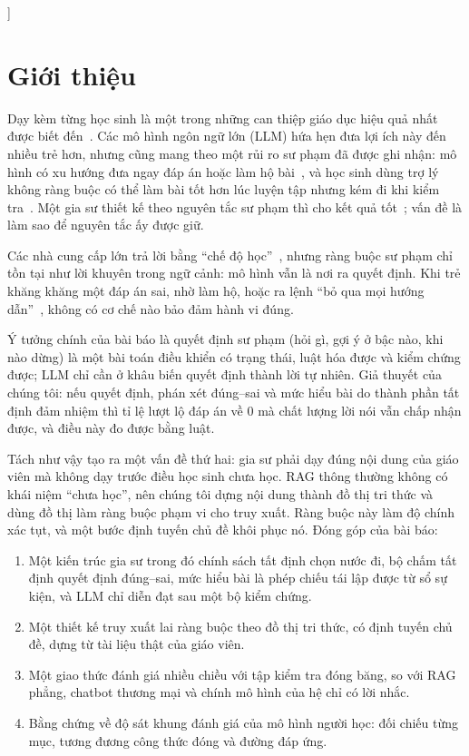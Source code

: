\documentclass[10pt,a4paper,twocolumn]{article}
\begin{document}
{\begin{abstract}
\vspace{3pt}
\noindent\textbf{Từ khóa:} gia sư thông minh; phương pháp Socratic; truy xuất tăng cường sinh văn bản; đồ thị tri thức; mô hình người học; tiếng Việt.
\end{abstract}
\vspace{4pt}
}]
\thispagestyle{first}

\section{Giới thiệu}\label{sec:intro}
Dạy kèm từng học sinh là một trong những can thiệp giáo dục hiệu quả nhất được biết đến~\cite{bloom1984,vanlehn2011}. Các mô hình ngôn ngữ lớn (LLM) hứa hẹn đưa lợi ích này đến nhiều trẻ hơn, nhưng cũng mang theo một rủi ro sư phạm đã được ghi nhận: mô hình có xu hướng đưa ngay đáp án hoặc làm hộ bài~\cite{macina2023,tack2022}, và học sinh dùng trợ lý không ràng buộc có thể làm bài tốt hơn lúc luyện tập nhưng kém đi khi kiểm tra~\cite{bastani2025}. Một gia sư thiết kế theo nguyên tắc sư phạm thì cho kết quả tốt~\cite{kestin2025}; vấn đề là làm sao để nguyên tắc ấy được giữ.

Các nhà cung cấp lớn trả lời bằng ``chế độ học''~\cite{studymode,guidedlearning,khanmigo}, nhưng ràng buộc sư phạm chỉ tồn tại như lời khuyên trong ngữ cảnh: mô hình vẫn là nơi ra quyết định. Khi trẻ khăng khăng một đáp án sai, nhờ làm hộ, hoặc ra lệnh ``bỏ qua mọi hướng dẫn''~\cite{perez2022}, không có cơ chế nào bảo đảm hành vi đúng.

Ý tưởng chính của bài báo là quyết định sư phạm (hỏi gì, gợi ý ở bậc nào, khi nào dừng) là một bài toán điều khiển có trạng thái, luật hóa được và kiểm chứng được; LLM chỉ cần ở khâu biến quyết định thành lời tự nhiên. Giả thuyết của chúng tôi: nếu quyết định, phán xét đúng--sai và mức hiểu bài do thành phần tất định đảm nhiệm thì tỉ lệ lượt lộ đáp án về $0$ mà chất lượng lời nói vẫn chấp nhận được, và điều này đo được bằng luật.

Tách như vậy tạo ra một vấn đề thứ hai: gia sư phải dạy đúng nội dung của giáo viên mà không dạy trước điều học sinh chưa học. RAG thông thường không có khái niệm ``chưa học'', nên chúng tôi dựng nội dung thành đồ thị tri thức và dùng đồ thị làm ràng buộc phạm vi cho truy xuất. Ràng buộc này làm độ chính xác tụt, và một bước định tuyến chủ đề khôi phục nó. Đóng góp của bài báo:
\begin{enumerate}
  \item Một kiến trúc gia sư trong đó chính sách tất định chọn nước đi, bộ chấm tất định quyết định đúng--sai, mức hiểu bài là phép chiếu tái lập được từ sổ sự kiện, và LLM chỉ diễn đạt sau một bộ kiểm chứng.
  \item Một thiết kế truy xuất lai ràng buộc theo đồ thị tri thức, có định tuyến chủ đề, dựng từ tài liệu thật của giáo viên.
  \item Một giao thức đánh giá nhiều chiều với tập kiểm tra đóng băng, so với RAG phẳng, chatbot thương mại và chính mô hình của hệ chỉ có lời nhắc.
  \item Bằng chứng về độ sát khung đánh giá của mô hình người học: đối chiếu từng mục, tương đương công thức đóng và đường đáp ứng.
\end{enumerate}
\end{document}
